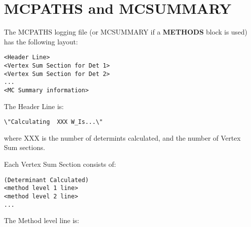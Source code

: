 \documentclass[openany,a4paper,10pt]{manual}
\begin{document}
\resetcurrentobjects


\hypertarget{output-mcpaths}{}\section{MCPATHS and MCSUMMARY}

The MCPATHS logging file (or MCSUMMARY if a \textbf{METHODS} block is used) has the following layout:

\begin{Verbatim}[commandchars=@\[\]]
<Header Line>
<Vertex Sum Section for Det 1>
<Vertex Sum Section for Det 2>
...
<MC Summary information>
\end{Verbatim}

The Header Line is:

\begin{Verbatim}[commandchars=@\[\]]
\"Calculating  XXX W_Is...\"
\end{Verbatim}

where XXX is the number of determints calculated, and the number of Vertex Sum sections.

Each Vertex Sum Section consists of:

\begin{Verbatim}[commandchars=@\[\]]
(Determinant Calculated)
<method level 1 line>
<method level 2 line>
...
\end{Verbatim}

The Method level line is:
\end{document}
